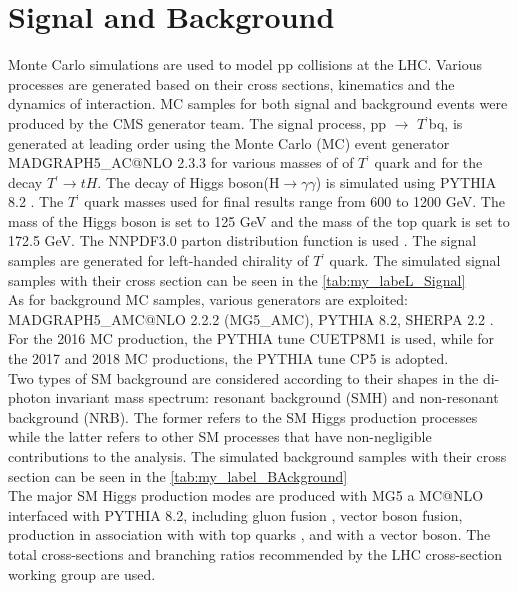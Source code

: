 \chapter{\label{signal_background}Signal and Background}


Monte Carlo simulations are used to model pp collisions at the LHC. Various processes are generated based on their cross sections, kinematics and the dynamics of interaction. MC samples for both signal and background events were produced by the CMS generator team. 
The signal process, pp $\longrightarrow$ $T{^’}$bq, is generated at leading order using the Monte Carlo (MC) event generator MADGRAPH5\_AC@NLO 2.3.3 \cite{Alwall2014, Artoisenet2013}for various masses of of $T{^’}$ quark and for the decay $T{^'}\longrightarrow tH$. The decay of Higgs boson(H$\longrightarrow \gamma \gamma$) is simulated using PYTHIA 8.2 \cite{SJOSTRAND2015159}. The $T{^’}$ quark masses used for final results range from 600 to 1200 GeV. The mass of the Higgs boson is set to 125 GeV and the mass of the top quark is set to 172.5 GeV. The NNPDF3.0 parton distribution function is used \cite{Ball_2015} . The signal samples are generated for left-handed chirality of $T{^’}$ quark. The simulated signal samples with their cross section can be seen in the \autoref{tab:my_labeL_Signal} \\
As for background MC samples, various generators are exploited: MADGRAPH5\_AMC@NLO 2.2.2 (MG5\_AMC), PYTHIA 8.2\cite{SJOSTRAND2015159}, SHERPA 2.2 \cite{10.21468/SciPostPhys.7.3.034}. For the 2016 MC production, the PYTHIA tune CUETP8M1 \cite{Khachatryan2016} is used, while for the 2017 and 2018 MC productions, the PYTHIA tune CP5 \cite{Sirunyan2020} is adopted. \\
Two types of SM background are considered according to their shapes in the di-photon invariant mass spectrum: resonant background (SMH) and non-resonant background (NRB). The former refers to the SM Higgs production processes while the latter refers to other SM processes that have non-negligible contributions to the analysis. The simulated background samples with their cross section can be seen in the \autoref{tab:my_label_BAckground}\\
The major SM Higgs production modes are produced with MG5 a MC@NLO interfaced with PYTHIA 8.2, including gluon fusion \cite{Bagnaschi_2012}, vector boson fusion, production in association with with top quarks \cite{PhysRevD.91.094003}, and with a vector boson. The total cross-sections and branching ratios recommended by the LHC cross-section working group  are used.


